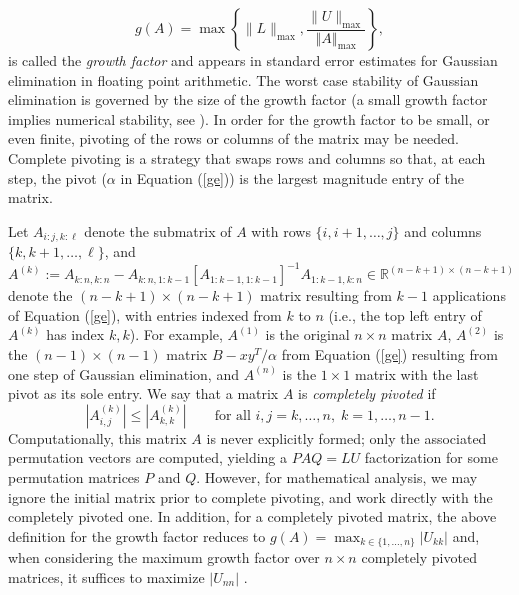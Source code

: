 \documentclass[reqno]{amsart}
\numberwithin{equation}{section}
\newcommand{\norm}[1]{\left\Vert #1 \right\Vert}
\begin{document}
 \begin{equation}g(A) = \max \left\{ \| L \|_{\max}, \frac{\|U\|_{\max}}{\norm{A}_{\max}}   \right\}, \end{equation}
is called the {\it growth factor} and appears in standard error estimates for Gaussian elimination in floating point arithmetic. The worst case stability of Gaussian elimination is governed by the size of the growth factor (a small growth factor implies numerical stability, see \cite[Theorem 9.5]{higham2002accuracy}). In order for the growth factor to be small, or even finite, pivoting of the rows or columns of the matrix may be needed. Complete pivoting is a strategy that swaps rows and columns so that, at each step, the pivot ($\alpha$ in Equation (\ref{ge})) is the largest magnitude entry of the matrix. 

Let $A_{i:j,k:\ell}$ denote the submatrix of $A$ with rows $\{i,i+1,\ldots,j\}$ and columns $\{k,k+1,\ldots,\ell\}$, and
\begin{equation}\label{GE}
A^{(k)}:= A_{k:n,k:n} - A_{k:n,1:k-1} \left[A_{1:k-1,1:k-1}\right]^{-1}A_{1:k-1,k:n} \in \mathbb{R}^{(n-k+1) \times (n-k+1)}
\end{equation}
denote the $(n-k+1) \times (n-k+1)$ matrix resulting from $k-1$ applications of Equation (\ref{ge}), with entries indexed from $k$ to $n$ (i.e., the top left entry of $A^{(k)}$ has index $k,k$). For example, $A^{(1)}$ is the original $n \times n$ matrix $A$, $A^{(2)}$ is the $(n-1)\times (n-1)$ matrix $B- x y^T / \alpha$ from Equation (\ref{ge}) resulting from one step of Gaussian elimination, and $A^{(n)}$ is the $1 \times 1$ matrix with the last pivot as its sole entry. We say that a matrix $A$ is \emph{completely pivoted} if
\begin{equation}|A^{(k)}_{i,j}| \le |A^{(k)}_{k,k}| \qquad \text{for all  } i,j = k,\ldots,n, \; k = 1,\ldots, n-1.\end{equation}
Computationally, this matrix $A$ is never explicitly formed; only the associated permutation vectors are computed, yielding a $PAQ = LU$ factorization for some permutation matrices $P$ and $Q$. However, for mathematical analysis, we may ignore the initial matrix prior to complete pivoting, and work directly with the completely pivoted one. In addition, for a completely pivoted matrix, the above definition for the growth factor reduces to
$g(A) = \max_{k \in \{1,\ldots,n\}}|U_{kk}|$
and, when considering the maximum growth factor over $n \times n$ completely pivoted matrices, it suffices to maximize $|U_{nn}|$ \cite[Lemma 5.1]{edelman2024some}.
\end{document}
